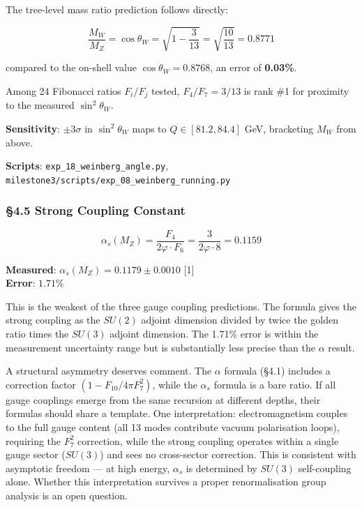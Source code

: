 \documentclass[
  11pt,
  a4paper]{article}
\begin{document}
The tree-level mass ratio prediction follows directly:

\[\frac{M_W}{M_Z} = \cos\theta_W = \sqrt{1 - \frac{3}{13}} = \sqrt{\frac{10}{13}} = 0.8771\]

compared to the on-shell value \(\cos\theta_W = 0.8768\), an error of
\textbf{0.03\%}.

Among 24 Fibonacci ratios \(F_i/F_j\) tested, \(F_4/F_7 = 3/13\) is rank
\#1 for proximity to the measured \(\sin^2\theta_W\).

\textbf{Sensitivity}: \(\pm 3\sigma\) in \(\sin^2\theta_W\) maps to
\(Q \in [81.2, 84.4]\) GeV, bracketing \(M_W\) from above.

\textbf{Scripts}: \texttt{exp\_18\_weinberg\_angle.py},
\texttt{milestone3/scripts/exp\_08\_weinberg\_running.py}

\subsubsection{§4.5 Strong Coupling
Constant}\label{strong-coupling-constant}

\[\alpha_s(M_Z) = \frac{F_4}{2\varphi \cdot F_6} = \frac{3}{2\varphi \cdot 8} = 0.1159\]

\textbf{Measured}: \(\alpha_s(M_Z) = 0.1179 \pm 0.0010\) {[}1{]}\\
\textbf{Error}: \(1.71\%\)

This is the weakest of the three gauge coupling predictions. The formula
gives the strong coupling as the \(SU(2)\) adjoint dimension divided by
twice the golden ratio times the \(SU(3)\) adjoint dimension. The 1.71\%
error is within the measurement uncertainty range but is substantially
less precise than the \(\alpha\) result.

A structural asymmetry deserves comment. The \(\alpha\) formula (§4.1)
includes a correction factor \((1 - F_{10}/4\pi F_7^2)\), while the
\(\alpha_s\) formula is a bare ratio. If all gauge couplings emerge from
the same recursion at different depths, their formulas should share a
template. One interpretation: electromagnetism couples to the full gauge
content (all 13 modes contribute vacuum polarisation loops), requiring
the \(F_7^2\) correction, while the strong coupling operates within a
single gauge sector (\(SU(3)\)) and sees no cross-sector correction.
This is consistent with asymptotic freedom --- at high energy,
\(\alpha_s\) is determined by \(SU(3)\) self-coupling alone. Whether
this interpretation survives a proper renormalisation group analysis is
an open question.
\end{document}
